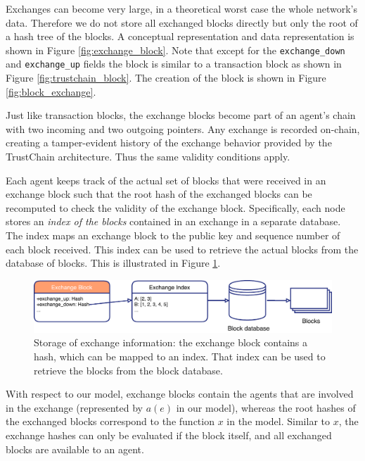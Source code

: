 Exchanges can become very large, in a theoretical 
worst case the whole network's data. Therefore we do not store all exchanged blocks directly but only
the root of a hash tree of the blocks. A conceptual representation and data representation 
is shown in Figure \ref{fig:exchange_block}. Note that except for the \verb|exchange_down| and \verb|exchange_up|
fields the block is similar to a transaction block as shown in Figure \ref{fig:trustchain_block}. 
The creation of the block is shown in Figure \ref{fig:block_exchange}.

Just like transaction blocks, the exchange blocks become part of an agent's chain with two incoming
and two outgoing pointers. Any exchange is recorded on-chain, creating a tamper-evident history 
of the exchange behavior provided by the TrustChain architecture.
Thus the same validity conditions apply. 


Each agent keeps track of the actual set of blocks that were received in an exchange block such that 
the root hash of the exchanged blocks can be recomputed to check the validity of the exchange block. Specifically, each 
node stores an \textit{index of the blocks} contained in an exchange in a separate database. The 
index maps an exchange block to the public key and sequence number of each
block received. This index can be 
used to retrieve the actual blocks from the database of blocks. This is illustrated in Figure \ref{fig:exchange_process}.

\begin{figure}
    \centering
    \includegraphics[width=\textwidth]{images/block_exchange_retrieval.pdf}
    \caption{Storage of exchange information: the exchange block contains a hash, which can be mapped to an index. That index can be used to retrieve the blocks from the block database.}
    \label{fig:exchange_process}
\end{figure}

With respect to our model, exchange blocks contain the agents that are involved in the exchange 
(represented by $a(e)$ in our model), whereas the root hashes of the exchanged blocks correspond to
the function $x$ in the model. Similar to $x$, the exchange hashes can only be evaluated if the 
block itself, and all exchanged blocks are available to an agent.

